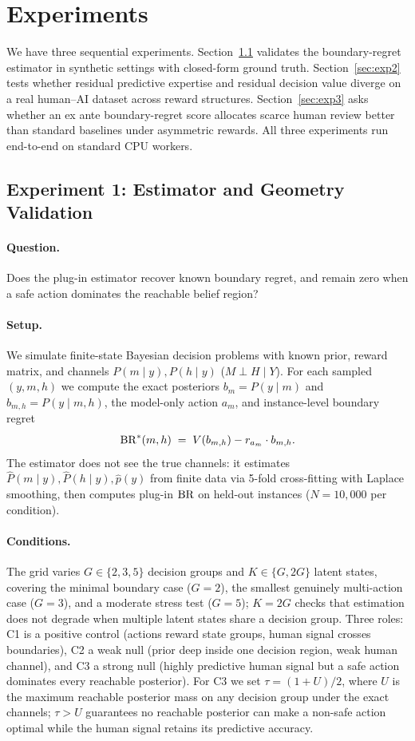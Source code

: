 \section{Experiments}
\label{sec:experiments}

We have three sequential experiments.
Section~\ref{sec:exp1} validates the boundary-regret estimator in synthetic settings with closed-form ground truth.
Section~\ref{sec:exp2} tests whether residual predictive expertise and residual decision value diverge on a real human--AI dataset across reward structures.
Section~\ref{sec:exp3} asks whether an ex ante boundary-regret score allocates scarce human review better than standard baselines under asymmetric rewards.
All three experiments run end-to-end on standard CPU workers.

\subsection{Experiment 1: Estimator and Geometry Validation}
\label{sec:exp1}

\paragraph{Question.}
Does the plug-in estimator recover known boundary regret, and remain zero when a safe action dominates the reachable belief region?

\paragraph{Setup.}
We simulate finite-state Bayesian decision problems with known prior, reward matrix, and channels $P(m\mid y), P(h\mid y)$ ($M \perp H \mid Y$).
For each sampled $(y,m,h)$ we compute the exact posteriors $b_m=P(y\mid m)$ and $b_{m,h}=P(y\mid m,h)$, the model-only action $a_m$, and instance-level boundary regret
\[
  \operatorname{BR}^{*}(m,h) \;=\; V(b_{m,h}) - r_{a_m}\cdot b_{m,h}.
\]
The estimator does not see the true channels: it estimates $\hat P(m\mid y), \hat P(h\mid y), \hat p(y)$ from finite data via 5-fold cross-fitting with Laplace smoothing, then computes plug-in $\operatorname{BR}$ on held-out instances ($N=10{,}000$ per condition).

\paragraph{Conditions.}
The grid varies $G\in\{2,3,5\}$ decision groups and $K\in\{G,2G\}$ latent states, covering the minimal boundary case ($G=2$), the smallest genuinely multi-action case ($G=3$), and a moderate stress test ($G=5$); $K=2G$ checks that estimation does not degrade when multiple latent states share a decision group.
Three roles: C1 is a positive control (actions reward state groups, human signal crosses boundaries), C2 a weak null (prior deep inside one decision region, weak human channel), and C3 a strong null (highly predictive human signal but a safe action dominates every reachable posterior).
For C3 we set $\tau=(1+U)/2$, where $U$ is the maximum reachable posterior mass on any decision group under the exact channels; $\tau>U$ guarantees no reachable posterior can make a non-safe action optimal while the human signal retains its predictive accuracy.

